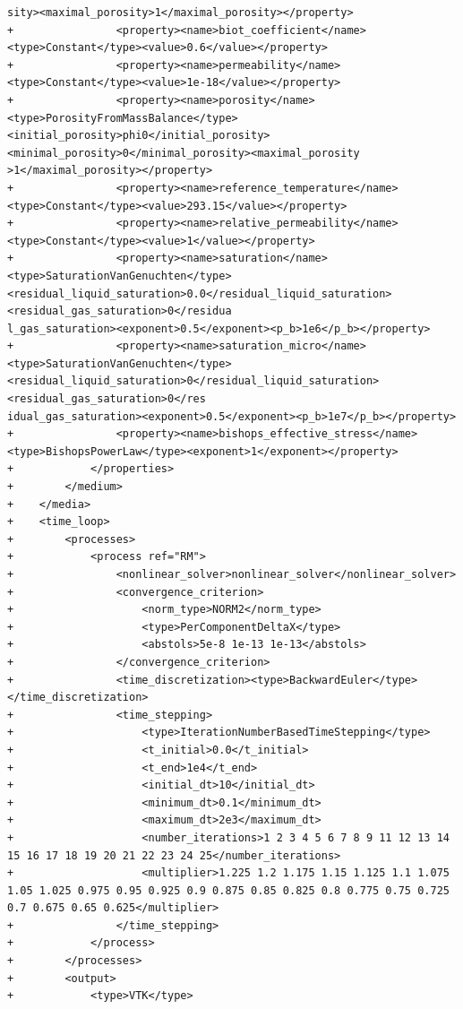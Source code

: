 \documentclass[10pt]{article}
\begin{document}
\begin{lstlisting}
sity><maximal_porosity>1</maximal_porosity></property>
+                <property><name>biot_coefficient</name><type>Constant</type><value>0.6</value></property>
+                <property><name>permeability</name><type>Constant</type><value>1e-18</value></property>
+                <property><name>porosity</name><type>PorosityFromMassBalance</type><initial_porosity>phi0</initial_porosity><minimal_porosity>0</minimal_porosity><maximal_porosity
>1</maximal_porosity></property>
+                <property><name>reference_temperature</name><type>Constant</type><value>293.15</value></property>
+                <property><name>relative_permeability</name><type>Constant</type><value>1</value></property>
+                <property><name>saturation</name><type>SaturationVanGenuchten</type><residual_liquid_saturation>0.0</residual_liquid_saturation><residual_gas_saturation>0</residua
l_gas_saturation><exponent>0.5</exponent><p_b>1e6</p_b></property>
+                <property><name>saturation_micro</name><type>SaturationVanGenuchten</type><residual_liquid_saturation>0</residual_liquid_saturation><residual_gas_saturation>0</res
idual_gas_saturation><exponent>0.5</exponent><p_b>1e7</p_b></property>
+                <property><name>bishops_effective_stress</name><type>BishopsPowerLaw</type><exponent>1</exponent></property>
+            </properties>
+        </medium>
+    </media>
+    <time_loop>
+        <processes>
+            <process ref="RM">
+                <nonlinear_solver>nonlinear_solver</nonlinear_solver>
+                <convergence_criterion>
+                    <norm_type>NORM2</norm_type>
+                    <type>PerComponentDeltaX</type>
+                    <abstols>5e-8 1e-13 1e-13</abstols>
+                </convergence_criterion>
+                <time_discretization><type>BackwardEuler</type></time_discretization>
+                <time_stepping>
+                    <type>IterationNumberBasedTimeStepping</type>
+                    <t_initial>0.0</t_initial>
+                    <t_end>1e4</t_end>
+                    <initial_dt>10</initial_dt>
+                    <minimum_dt>0.1</minimum_dt>
+                    <maximum_dt>2e3</maximum_dt>
+                    <number_iterations>1 2 3 4 5 6 7 8 9 11 12 13 14 15 16 17 18 19 20 21 22 23 24 25</number_iterations>
+                    <multiplier>1.225 1.2 1.175 1.15 1.125 1.1 1.075 1.05 1.025 0.975 0.95 0.925 0.9 0.875 0.85 0.825 0.8 0.775 0.75 0.725 0.7 0.675 0.65 0.625</multiplier>
+                </time_stepping>
+            </process>
+        </processes>
+        <output>
+            <type>VTK</type>

\end{lstlisting}
\end{document}
